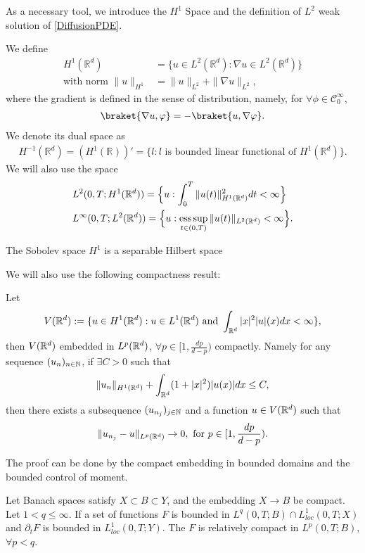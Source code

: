 As a necessary tool, we introduce the $H^1$ Space and the definition of $L^2$ weak solution of \autoref{DiffusionPDE}.
\begin{definition}
	We define 
	\begin{align*}
	H^1(\mathbb{R}^{d} ) &= \{u \in  L^2(\mathbb{R}^{d})  :  \nabla u \in  L^2(\mathbb{R}^{d}) \}  \\
	\mbox{with norm }	\|u\|_{H^1} &= \|u\|_{L^2} + \|\nabla u\|_{L^2},
	\end{align*}
	where the gradient is defined in the sense of distribution, namely, for $\forall  \phi \in  \mathcal{C}_0^{\infty} $,
	\begin{align*}
	\braket{\nabla u , \phi } = -\braket{u,\nabla \phi }
	.\end{align*}
	We denote its dual space as
	\begin{align*}
	H^{-1}(\mathbb{R}^{d} )  =  (H^{1}(\mathbb{R}^{} ) )' =  \{l : l\text{ is bounded linear functional of } H^{1}(\mathbb{R}^{d} )  \}  
	.\end{align*}
	We will also use the space 
	\begin{align*}
	&L^2(0,T;H^{1}(\mathbb{R}^{d} ) ) = \Big\{u : \int_0^{T} \|u(t)\|^2_{H^1(\mathbb{R}^d)} dt < \infty \Big\}  \\
	&	L^{\infty}(0,T;L^2(\mathbb{R}^{d} ))=\Big\{u : \operatorname*{ess\,sup}_{t\in(0,T)} \|u(t)\|_{L^2(\mathbb{R}^d)}  < \infty \Big\}
	.\end{align*}
\end{definition}

\begin{remark}
	The Sobolev space $H^1$ is a separable Hilbert space 
\end{remark}

We will also use the following compactness result:

\begin{lemma}\label{embedding}
	Let 
	$$
	V(\mathbb{R}^d):=\{u\in H^1 (\mathbb{R}^d): u\in L^1(\mathbb{R}^d)\mbox{ and }\int_{\mathbb{R}^d}|x|^2|u|(x)dx<\infty\},
	$$
	then $V(\mathbb{R}^d)$ embedded in $L^p(\mathbb{R}^d)$, $\forall p\in [1,\frac{dp}{d-p})$ compactly. Namely for any sequence
	$(u_n)_{n\in\mathbb{N}}$, if $\exists C>0$ such that
	\begin{align*}
	\|u_n\|_{H^1(\mathbb{R}^d)}+\int_{\mathbb{R}^d} (1+|x|^2)|u(x)|dx\leq C,
	\end{align*}
	then there exists a subsequence $(u_{n_j})_{j\in\mathbb{N}}$ and a function $u\in V(\mathbb{R}^d)$ such that
	\begin{align*}
	\|u_{n_j}-u\|_{L^p(\mathbb{R}^d)}\to 0, \mbox{ for } p\in [1,\frac{dp}{d-p}).
	\end{align*}	
\end{lemma}
\vskip3mm
The proof can be done by the compact embedding in bounded domains and the bounded control of moment.
\begin{lemma}
	Let Banach spaces satisfy $X\subset B\subset Y$, and the embedding $X\rightarrow B$ be compact. Let $1<q\leq \infty$. If a set of functions $F$ is bounded in $L^q(0,T;B)\cap L^1_{loc}(0,T;X)$ and $\partial_t F$ is bounded in $L^1_{loc}(0,T;Y)$. The $F$ is relatively compact in $L^p(0,T;B)$, $\forall p<q$.
\end{lemma}

